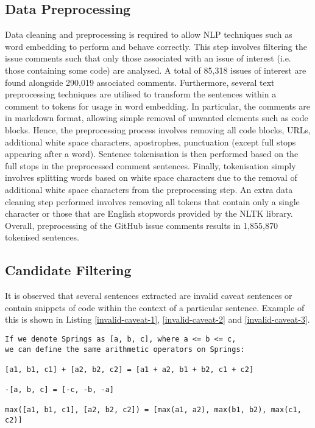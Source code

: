
\subsection{Data Preprocessing}
\label{subsec:info-data-preprocess}
Data cleaning and preprocessing is required to allow NLP techniques such as word embedding to perform and behave correctly. This step involves filtering the issue comments such that only those associated with an issue of interest (i.e. those containing some code) are analysed. A total of 85,318 issues of interest are found alongside 290,019 associated comments.
Furthermore, several text preprocessing techniques are utilised to transform the sentences within a comment to tokens for usage in word embedding. In particular, the comments are in markdown format, allowing simple removal of unwanted elements such as code blocks. Hence, the preprocessing process involves removing all code blocks, URLs, additional white space characters, apostrophes, punctuation (except full stops appearing after a word).  Sentence tokenisation is then performed based on the full stops in the preprocessed comment sentences. Finally, tokenisation simply involves splitting words based on white space characters due to the removal of additional white space characters from the preprocessing step. An extra data cleaning step performed involves removing all tokens that contain only a single character or those that are English stopwords provided by the NLTK library. Overall, preprocessing of the GitHub issue comments results in 1,855,870 tokenised sentences.

\subsection{Candidate Filtering}
\label{subsec:info-candidate-filtering}
It is observed that several sentences extracted are invalid caveat sentences or contain snippets of code within the context of a particular sentence. Example of this is shown in Listing \ref{invalid-caveat-1}, \ref{invalid-caveat-2} and \ref{invalid-caveat-3}.

\begin{lstlisting}[label=invalid-caveat-1,caption={An example of a caveat sentence extracted from the \lstinline{javax.swing.Spring} documentation containing some snippets of code or mathematical expressions},float,frame=tb,numbers=none,language=None]
If we denote Springs as [a, b, c], where a <= b <= c, 
we can define the same arithmetic operators on Springs:

[a1, b1, c1] + [a2, b2, c2] = [a1 + a2, b1 + b2, c1 + c2]

-[a, b, c] = [-c, -b, -a]

max([a1, b1, c1], [a2, b2, c2]) = [max(a1, a2), max(b1, b2), max(c1, c2)]
\end{lstlisting}

